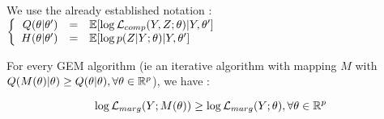 \documentclass[a4paper]{article}
\renewcommand{\varobs}{Y}
\begin{document}
\begin{myText}
We use the already established notation : $\stackeq[rcl]{ Q(\theta|\theta') &=& \mbb E[\log \Lcomp(\varobs, \varlat; \theta) | \varobs,\theta'] \\ H(\theta|\theta') &=& \mbb E[\log p(\varlat|\varobs; \theta) | \varobs,\theta']}$

\begin{theo}

For every GEM algorithm (ie an iterative algorithm with mapping $M$ with $Q(M(\theta)|\theta) \geq Q(\theta|\theta), \forall \theta\in\mathbb R^p$), we have : 

$$\log\Lmarg(\varobs; M(\theta)) \geq \log\Lmarg(\varobs;\theta), \forall \theta\in\setr^p$$

\end{theo}






\end{myText}
\end{document}
